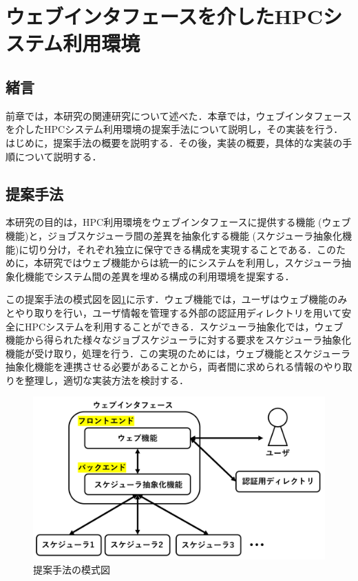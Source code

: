 
\section{ウェブインタフェースを介したHPCシステム利用環境}

\subsection{緒言}
前章では，本研究の関連研究について述べた．本章では，ウェブインタフェースを介したHPCシステム利用環境の提案手法について説明し，その実装を行う．はじめに，提案手法の概要を説明する．その後，実装の概要，具体的な実装の手順について説明する．\par

\subsection{提案手法}
本研究の目的は，HPC利用環境をウェブインタフェースに提供する機能 (ウェブ機能)と，ジョブスケジューラ間の差異を抽象化する機能 (スケジューラ抽象化機能)に切り分け，それぞれ独立に保守できる構成を実現することである．このために，本研究ではウェブ機能からは統一的にシステムを利用し，スケジューラ抽象化機能でシステム間の差異を埋める構成の利用環境を提案する．\par
この提案手法の模式図を図\ref{fig6}に示す．ウェブ機能では，ユーザはウェブ機能のみとやり取りを行い，ユーザ情報を管理する外部の認証用ディレクトリを用いて安全にHPCシステムを利用することができる．スケジューラ抽象化では，ウェブ機能から得られた様々なジョブスケジューラに対する要求をスケジューラ抽象化機能が受け取り，処理を行う．この実現のためには，ウェブ機能とスケジューラ抽象化機能を連携させる必要があることから，両者間に求められる情報のやり取りを整理し，適切な実装方法を検討する．\par

\begin{figure}[tb]
    \centering
    \includegraphics[width=120mm]{./fig/proposed_method.png}
    \caption{提案手法の模式図}
    \label{fig6}
\end{figure}

